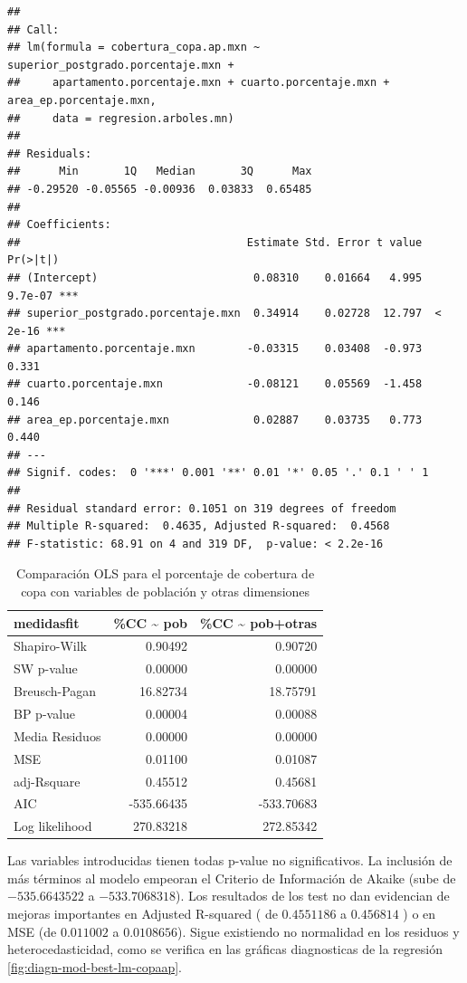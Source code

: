 \documentclass[12pt,]{book}
\begin{document}
\begin{verbatim}
## 
## Call:
## lm(formula = cobertura_copa.ap.mxn ~ superior_postgrado.porcentaje.mxn + 
##     apartamento.porcentaje.mxn + cuarto.porcentaje.mxn + area_ep.porcentaje.mxn, 
##     data = regresion.arboles.mn)
## 
## Residuals:
##      Min       1Q   Median       3Q      Max 
## -0.29520 -0.05565 -0.00936  0.03833  0.65485 
## 
## Coefficients:
##                                   Estimate Std. Error t value Pr(>|t|)    
## (Intercept)                        0.08310    0.01664   4.995  9.7e-07 ***
## superior_postgrado.porcentaje.mxn  0.34914    0.02728  12.797  < 2e-16 ***
## apartamento.porcentaje.mxn        -0.03315    0.03408  -0.973    0.331    
## cuarto.porcentaje.mxn             -0.08121    0.05569  -1.458    0.146    
## area_ep.porcentaje.mxn             0.02887    0.03735   0.773    0.440    
## ---
## Signif. codes:  0 '***' 0.001 '**' 0.01 '*' 0.05 '.' 0.1 ' ' 1
## 
## Residual standard error: 0.1051 on 319 degrees of freedom
## Multiple R-squared:  0.4635, Adjusted R-squared:  0.4568 
## F-statistic: 68.91 on 4 and 319 DF,  p-value: < 2.2e-16
\end{verbatim}

\begin{table}

\caption{\label{tab:comp-lmcopaap-pob-mod}Comparación OLS para el porcentaje de cobertura de copa con variables de población y otras dimensiones}
\centering
\begin{tabular}[t]{l|r|r}
\hline
medidasfit & \%CC \textasciitilde{} pob & \%CC \textasciitilde{} pob+otras\\
\hline
Shapiro-Wilk & 0.90492 & 0.90720\\
\hline
SW p-value & 0.00000 & 0.00000\\
\hline
Breusch-Pagan & 16.82734 & 18.75791\\
\hline
BP p-value & 0.00004 & 0.00088\\
\hline
Media Residuos & 0.00000 & 0.00000\\
\hline
MSE & 0.01100 & 0.01087\\
\hline
adj-Rsquare & 0.45512 & 0.45681\\
\hline
AIC & -535.66435 & -533.70683\\
\hline
Log likelihood & 270.83218 & 272.85342\\
\hline
\end{tabular}
\end{table}

Las variables introducidas tienen todas p-value no significativos. La
inclusión de más términos al modelo empeoran el Criterio de Información
de Akaike (sube de \(-535.6643522\) a \(-533.7068318\)). Los resultados
de los test no dan evidencian de mejoras importantes en Adjusted
R-squared ( de \(0.4551186\) a \(0.456814\) ) o en MSE (de \(0.011002\)
a \(0.0108656\)). Sigue existiendo no normalidad en los residuos y
heterocedasticidad, como se verifica en las gráficas diagnosticas de la
regresión \ref{fig:diagn-mod-best-lm-copaap}.
\end{document}
